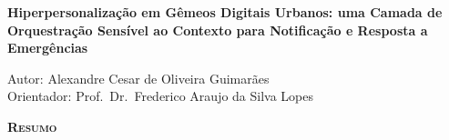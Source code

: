 \begin{center}
	{\Large{\textbf{Hiperpersonalização em Gêmeos Digitais Urbanos: uma Camada de Orquestração Sensível ao Contexto para Notificação e Resposta a Emergências}}}
\end{center}

\vspace{1cm}

\begin{flushright}
	Autor: Alexandre Cesar de Oliveira Guimarães\\
	Orientador: Prof.\ Dr.\ Frederico Araujo da Silva Lopes
\end{flushright}

\vspace{1cm}

\begin{center}
	\Large{\textsc{\textbf{Resumo}}}
\end{center}

